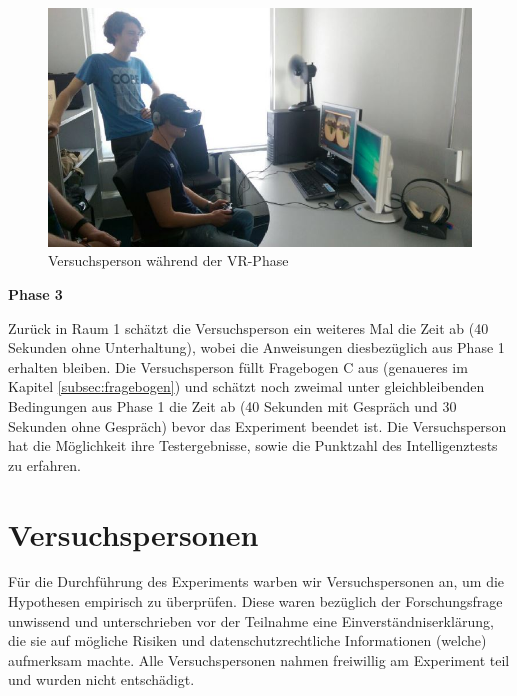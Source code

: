 \documentclass{Bericht}
\begin{document}
\begin{figure}[H]
	\centering    
	\includegraphics[height=\textheight, width=\linewidth, keepaspectratio]{../Bilder/v.jpg}
	\caption{Versuchsperson während der VR-Phase}
	\label{img:versuchsperson-in-vr}
\end{figure}

\textbf{Phase 3}

Zurück in Raum 1 schätzt die Versuchsperson ein weiteres Mal die Zeit ab (40 Sekunden ohne Unterhaltung), wobei die Anweisungen diesbezüglich aus Phase 1 erhalten bleiben. Die Versuchsperson füllt Fragebogen C aus (genaueres im Kapitel \ref{subsec:fragebogen}) und schätzt noch zweimal unter gleichbleibenden Bedingungen aus Phase 1 die Zeit ab (40 Sekunden mit Gespräch und 30 Sekunden ohne Gespräch) bevor das Experiment beendet ist. Die Versuchsperson hat die Möglichkeit ihre Testergebnisse, sowie die Punktzahl des Intelligenztests zu erfahren.


	\section{Versuchspersonen}
Für die Durchführung des Experiments warben wir Versuchspersonen an, um die Hypothesen empirisch zu überprüfen.
Diese waren bezüglich der Forschungsfrage unwissend und unterschrieben vor der Teilnahme eine Einverständniserklärung, die sie auf mögliche Risiken und datenschutzrechtliche Informationen (welche) aufmerksam machte. Alle Versuchspersonen nahmen freiwillig am Experiment teil und wurden nicht entschädigt. 
\end{document}
